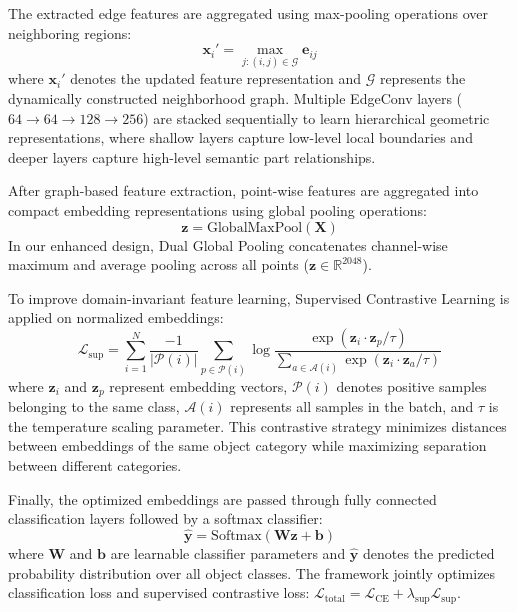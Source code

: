 \documentclass[conference]{IEEEtran}
\begin{document}
The extracted edge features are aggregated using max-pooling operations over neighboring regions:
\begin{equation}
\mathbf{x}_i' = \max_{j:(i,j) \in \mathcal{G}} \mathbf{e}_{ij}
\end{equation}
where $\mathbf{x}_i'$ denotes the updated feature representation and $\mathcal{G}$ represents the dynamically constructed neighborhood graph. Multiple EdgeConv layers ($64 \to 64 \to 128 \to 256$) are stacked sequentially to learn hierarchical geometric representations, where shallow layers capture low-level local boundaries and deeper layers capture high-level semantic part relationships.

After graph-based feature extraction, point-wise features are aggregated into compact embedding representations using global pooling operations:
\begin{equation}
\mathbf{z} = \text{GlobalMaxPool}(\mathbf{X})
\end{equation}
In our enhanced design, Dual Global Pooling concatenates channel-wise maximum and average pooling across all points ($\mathbf{z} \in \mathbb{R}^{2048}$).

To improve domain-invariant feature learning, Supervised Contrastive Learning is applied on normalized embeddings:
\begin{equation}
\mathcal{L}_{\text{sup}} = \sum_{i=1}^N \frac{-1}{|\mathcal{P}(i)|} \sum_{p \in \mathcal{P}(i)} \log \frac{\exp(\mathbf{z}_i \cdot \mathbf{z}_p / \tau)}{\sum_{a \in \mathcal{A}(i)} \exp(\mathbf{z}_i \cdot \mathbf{z}_a / \tau)}
\end{equation}
where $\mathbf{z}_i$ and $\mathbf{z}_p$ represent embedding vectors, $\mathcal{P}(i)$ denotes positive samples belonging to the same class, $\mathcal{A}(i)$ represents all samples in the batch, and $\tau$ is the temperature scaling parameter. This contrastive strategy minimizes distances between embeddings of the same object category while maximizing separation between different categories.

Finally, the optimized embeddings are passed through fully connected classification layers followed by a softmax classifier:
\begin{equation}
\hat{\mathbf{y}} = \text{Softmax}(\mathbf{W}\mathbf{z} + \mathbf{b})
\end{equation}
where $\mathbf{W}$ and $\mathbf{b}$ are learnable classifier parameters and $\hat{\mathbf{y}}$ denotes the predicted probability distribution over all object classes. The framework jointly optimizes classification loss and supervised contrastive loss: $\mathcal{L}_{\text{total}} = \mathcal{L}_{\text{CE}} + \lambda_{\text{sup}} \mathcal{L}_{\text{sup}}$.
\end{document}
